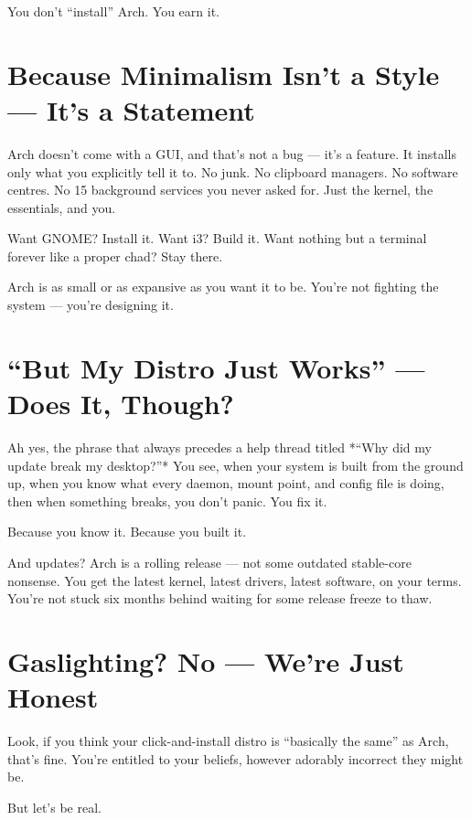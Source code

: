 \documentclass[12pt,openany]{book}
\begin{document}
You don’t “install” Arch. You earn it.

\section*{Because Minimalism Isn't a Style — It's a Statement}

Arch doesn't come with a GUI, and that’s not a bug — it’s a feature. It installs only what you explicitly tell it to. No junk. No clipboard managers. No software centres. No 15 background services you never asked for. Just the kernel, the essentials, and you.

Want GNOME? Install it. Want i3? Build it. Want nothing but a terminal forever like a proper chad? Stay there.

Arch is as small or as expansive as you want it to be. You’re not fighting the system — you’re designing it.

\section*{“But My Distro Just Works” — Does It, Though?}

Ah yes, the phrase that always precedes a help thread titled *“Why did my update break my desktop?”* You see, when your system is built from the ground up, when you know what every daemon, mount point, and config file is doing, then when something breaks, you don’t panic. You fix it.

Because you know it. Because you built it.

And updates? Arch is a rolling release — not some outdated stable-core nonsense. You get the latest kernel, latest drivers, latest software, on your terms. You're not stuck six months behind waiting for some release freeze to thaw.

\section*{Gaslighting? No — We’re Just Honest}

Look, if you think your click-and-install distro is “basically the same” as Arch, that’s fine. You’re entitled to your beliefs, however adorably incorrect they might be.

But let’s be real.
\end{document}
